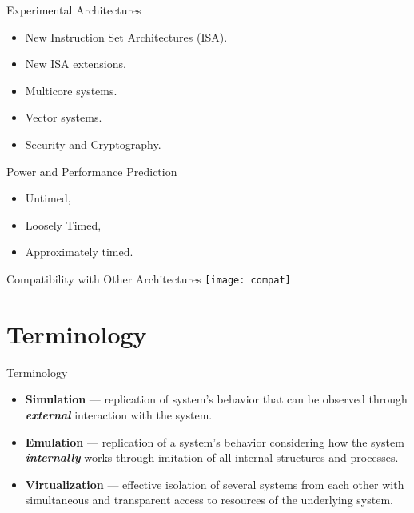 \begin{frame}{Experimental Architectures}

\begin{itemize}
\item New Instruction Set Architectures (ISA).
\item New ISA extensions.
\item Multicore systems.
\item Vector systems.
\item Security and Cryptography.
\end{itemize}

\end{frame}

\begin{frame}{Power and Performance Prediction}
\begin{itemize}
\item Untimed,
\item Loosely Timed,
\item Approximately timed.
\end{itemize}

\end{frame}

\begin{frame}{Compatibility with Other Architectures}
\texttt{[image: compat]} %
\end{frame}

\section{Terminology}

\begin{frame}{Terminology}
\begin{itemize}
\item \textbf{Simulation} --- replication of system's behavior that can be
      observed through \textbf{\textit{external}} interaction with the system.
\item \textbf{Emulation} --- replication of a system's behavior considering how
      the system \textbf{\textit{internally}} works through imitation of all
      internal structures and processes.
\item \textbf{Virtualization} --- effective isolation of several systems from
      each other with simultaneous and transparent access to resources of the
      underlying system.
\end{itemize}

\end{frame}


